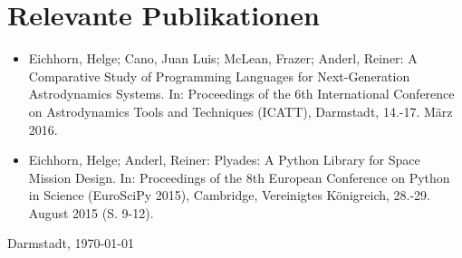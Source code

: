 \documentclass[10pt,a4paper]{moderncv}
\begin{document}
\section{Relevante Publikationen}
\begin{itemize}
    \item Eichhorn, Helge; Cano, Juan Luis; McLean, Frazer; Anderl, Reiner: A Comparative Study of Programming Languages for Next-Generation Astrodynamics Systems. In: Proceedings of the 6th International Conference on Astrodynamics Tools and Techniques (ICATT), Darmstadt, 14.-17. März 2016.
    \item Eichhorn, Helge; Anderl, Reiner: Plyades: A Python Library for Space Mission Design. In: Proceedings of the 8th European Conference on Python in Science (EuroSciPy 2015), Cambridge, Vereinigtes Königreich, 28.-29. August 2015 (S. 9-12).
\end{itemize}
\bigskip
\bigskip
\bigskip
\bigskip
\bigskip
\bigskip
Darmstadt, \today %
\end{document}
